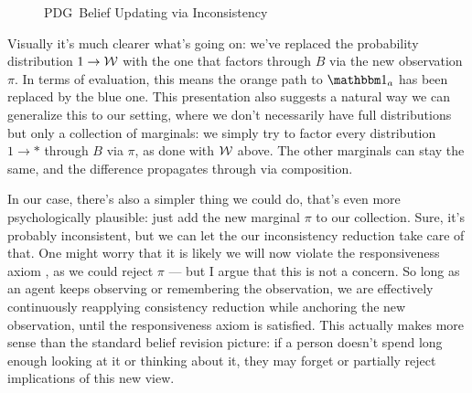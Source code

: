 \documentclass{article}
\newcommand{\MN}{PDG}
\begin{document}
	
	\begin{figure}[h]
		\centering
%				
%				
		\caption{\MN\ Belief Updating via Inconsistency}
	\end{figure}
	
	Visually it's much clearer what's going on: we've replaced the probability distribution $1 \to \cal W$ with the one that factors through $B$ via the new observation $\pi$. In terms of evaluation, this means the orange path to $\mathbbm 1_a$ has been replaced by the blue one.
	This presentation also suggests a natural way we can generalize this to our setting, where we don't necessarily have full distributions but only a collection of marginals: we simply try to factor every distribution $1 \to *$ through $B$ via $\pi$, as done with $\cal W$ above. The other marginals can stay the same, and the difference propagates through via composition.
	
	In our case, there's also a simpler thing we could do, that's even more psychologically plausible: just add the new marginal $\pi$ to our collection. Sure, it's probably inconsistent, but we can let the our inconsistency reduction take care of that. One might worry that it is likely we will now violate the responsiveness axiom \cite{dietrich2016belief}, as we could reject $\pi$ --- but I argue that this is not a concern. So long as an agent keeps observing or remembering the observation, we are effectively continuously reapplying consistency reduction while anchoring the new observation, until the responsiveness axiom is satisfied. This actually makes more sense than the standard belief revision picture: if a person doesn't spend long enough looking at it or thinking about it, they may forget or partially reject implications of this new view.
	
\end{document}
